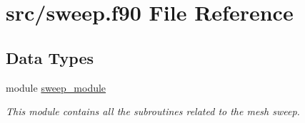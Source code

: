 \hypertarget{sweep_8f90}{\section{src/sweep.f90 File Reference}
\label{sweep_8f90}
}
\subsection*{Data Types}
\begin{DoxyCompactItemize}
\item 
module \hyperlink{classsweep__module}{sweep\-\_\-module}
\begin{DoxyCompactList}\small\item\em This module contains all the subroutines related to the mesh sweep. \end{DoxyCompactList}\end{DoxyCompactItemize}
